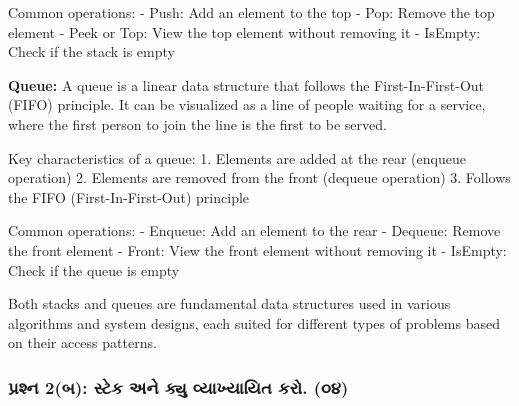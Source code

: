 Common operations: - Push: Add an element to the top - Pop: Remove the
top element - Peek or Top: View the top element without removing it -
IsEmpty: Check if the stack is empty

\begin{Shaded}
\begin{Highlighting}[]
\end{Highlighting}
\end{Shaded}

\textbf{Queue:} A queue is a linear data structure that follows the
First-In-First-Out (FIFO) principle. It can be visualized as a line of
people waiting for a service, where the first person to join the line is
the first to be served.

Key characteristics of a queue: 1. Elements are added at the rear
(enqueue operation) 2. Elements are removed from the front (dequeue
operation) 3. Follows the FIFO (First-In-First-Out) principle

Common operations: - Enqueue: Add an element to the rear - Dequeue:
Remove the front element - Front: View the front element without
removing it - IsEmpty: Check if the queue is empty

\begin{Shaded}
\begin{Highlighting}[]
\end{Highlighting}
\end{Shaded}

Both stacks and queues are fundamental data structures used in various
algorithms and system designs, each suited for different types of
problems based on their access patterns.

\hypertarget{uxaaauxab0uxab6uxaa8-2uxaac-uxab8uxa9fuxa95-uxa85uxaa8-uxa95uxaaf-uxab5uxaafuxa96uxaafuxaafuxaa4-uxa95uxab0.-uxae6uxaea}{%
\subsubsection{પ્રશ્ન 2(બ): સ્ટેક અને ક્યુ વ્યાખ્યાયિત કરો.
(૦૪)}\label{uxaaauxab0uxab6uxaa8-2uxaac-uxab8uxa9fuxa95-uxa85uxaa8-uxa95uxaaf-uxab5uxaafuxa96uxaafuxaafuxaa4-uxa95uxab0.-uxae6uxaea}}

